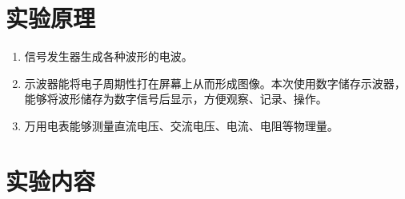 \documentclass[11pt]{article}
\begin{document}
\section{实验原理}
\begin{enumerate}
    \item 信号发生器生成各种波形的电波。
    \item 示波器能将电子周期性打在屏幕上从而形成图像。本次使用数字储存示波器，能够将波形储存为数字信号后显示，方便观察、记录、操作。
    \item 万用电表能够测量直流电压、交流电压、电流、电阻等物理量。
\end{enumerate}


\section{实验内容}
\end{document}
